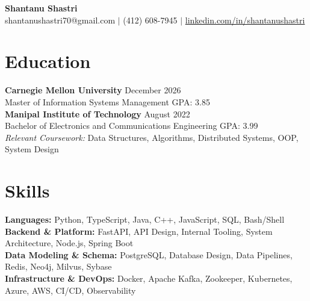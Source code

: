 \documentclass[11pt,a4paper]{article}
\begin{document}
\begin{center}
    \Huge \textbf{Shantanu Shastri} \\
    \vspace{2pt}
    \small shantanushastri70@gmail.com $|$ (412) 608-7945 $|$ \href{https://linkedin.com/in/shantanushastri}{linkedin.com/in/shantanushastri}
\end{center}

\vspace{-5pt}
\section{Education}
\noindent
\textbf{Carnegie Mellon University} \hfill December 2026 \\
Master of Information Systems Management \hfill GPA: 3.85 \\
\textbf{Manipal Institute of Technology} \hfill August 2022 \\
Bachelor of Electronics and Communications Engineering \hfill GPA: 3.99 \\
\textit{Relevant Coursework:} Data Structures, Algorithms, Distributed Systems, OOP, System Design

\vspace{-5pt}
\section{Skills}
\noindent
\textbf{Languages:} Python, TypeScript, Java, C++, JavaScript, SQL, Bash/Shell \\
\textbf{Backend \& Platform:} FastAPI, API Design, Internal Tooling, System Architecture, Node.js, Spring Boot \\
\textbf{Data Modeling \& Schema:} PostgreSQL, Database Design, Data Pipelines, Redis, Neo4j, Milvus, Sybase \\
\textbf{Infrastructure \& DevOps:} Docker, Apache Kafka, Zookeeper, Kubernetes, Azure, AWS, CI/CD, Observability

\vspace{-5pt}
\end{document}
